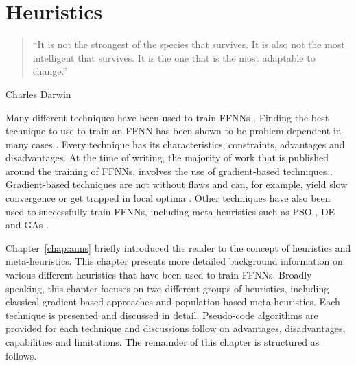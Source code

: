 \chapter{Heuristics}\label{chap:heuristics}

\begin{quotation}
      \noindent ``It is not the strongest of the species that survives. It is also not the most intelligent that survives. It is the one that is the most adaptable to change.''
\end{quotation}
\begin{flushright}
      Charles Darwin
\end{flushright}

\noindent
Many different techniques have been used to train \acp{FFNN} \cite{ref:kingma:2014}. Finding the best technique to use to train an \acs{FFNN} has been shown to be problem dependent in many cases \cite{ref:kheiri:2017}. Every technique has its characteristics, constraints, advantages and disadvantages. At the time of writing, the majority of work that is published around the training of \acp{FFNN}, involves the use of gradient-based techniques \cite{ref:nel:2021}. Gradient-based techniques are not without flaws and can, for example, yield slow convergence or get trapped in local optima \cite{ref:mingguang:2009}. Other techniques have also been used to successfully train \acp{FFNN}, including meta-heuristics such as \acf{PSO} \cite{ref:rakitianskaia:2012, ref:vanwyk:2014}, \acf{DE} \cite{ref:espinal:2011} and \acfp{GA} \cite{ref:gupta:1999}.

Chapter~\ref{chap:anns} briefly introduced the reader to the concept of heuristics and meta-heuristics. This chapter presents more detailed background information on various different heuristics that have been used to train \acp{FFNN}. Broadly speaking, this chapter focuses on two different groups of heuristics, including classical gradient-based approaches and population-based meta-heuristics. Each technique is presented and discussed in detail. Pseudo-code algorithms are provided for each technique and discussions follow on advantages, disadvantages, capabilities and limitations. The remainder of this chapter is structured as follows.

